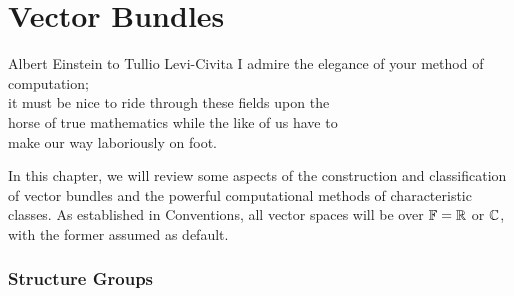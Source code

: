 \chapter{Vector Bundles}\label{chap:vector-bundles}

\begin{epigraph}{24em}{Albert Einstein {\normalfont to} Tullio Levi-Civita}
	I admire the elegance of your method of computation;\\
	it must be nice to ride through these fields upon the\\
	horse of true mathematics while the like of us have to\\
	make our way laboriously on foot.\\
\end{epigraph}

In this chapter, we will review some aspects of the construction and classification of vector bundles and the powerful computational methods of characteristic classes. As established in Conventions, all vector spaces will be over $\mathbb{F}=\mathbb{R}$ or $\mathbb{C}$, with the former assumed as default.

\subsection{Structure Groups}\label{sec:structure-groups}

